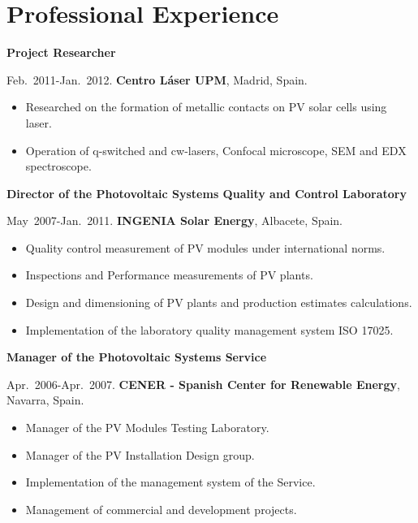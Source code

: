 \documentclass{article}
\begin{document}

\section*{Professional Experience}

{\bf Project Researcher}

\medskip
Feb.~2011-Jan.~2012.
{\bf Centro L\'aser UPM},
Madrid, Spain.

\begin{itemize}\itemsep 0pt
\item Researched on the formation of metallic contacts on PV solar cells using laser.
\item Operation of q-switched and cw-lasers, Confocal microscope, SEM and EDX spectroscope.
\end{itemize}

{\bf Director of the Photovoltaic Systems Quality and Control Laboratory}

\medskip
May~2007-Jan.~2011.
{\bf INGENIA Solar Energy},
Albacete, Spain.

\begin{itemize}\itemsep 0pt
\item Quality control measurement of PV modules under international norms.
\item Inspections and Performance measurements of PV plants.
\item Design and dimensioning of PV plants and production estimates calculations.
\item Implementation of the laboratory quality management system ISO 17025.
\end{itemize}

{\bf Manager of the Photovoltaic Systems Service}

\medskip
Apr.~2006-Apr.~2007.
{\bf CENER - Spanish Center for Renewable Energy},
Navarra, Spain.

\begin{itemize}\itemsep 0pt
\item Manager of the PV Modules Testing Laboratory.
\item Manager of the PV Installation Design group.
\item Implementation of the management system of the Service.
\item Management of commercial and development projects.
\end{itemize}
\end{document}
